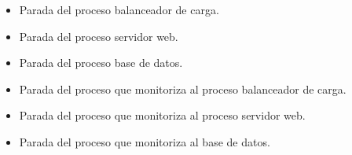 \begin{itemize}
\item Parada del proceso balanceador de carga.
\item Parada del proceso servidor web.
\item Parada del proceso base de datos.
\item Parada del proceso que monitoriza al proceso balanceador de carga.
\item Parada del proceso que monitoriza al proceso servidor web.
\item Parada del proceso que monitoriza al base de datos.
\end{itemize}
